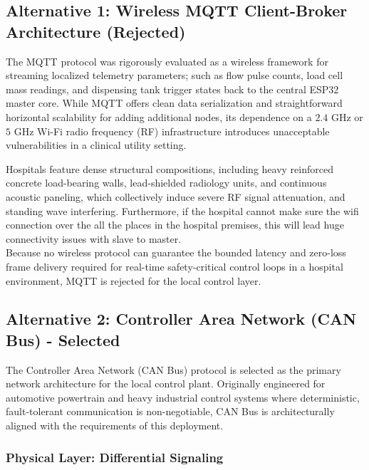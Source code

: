 \documentclass[12pt,a4paper]{article}
\begin{document}
\subsection{Alternative 1: Wireless MQTT Client-Broker Architecture (Rejected)}

The MQTT protocol was rigorously evaluated as a wireless framework for streaming localized telemetry parameters; such as flow pulse counts, load cell mass readings, and dispensing tank trigger states back to the central ESP32 master core. While MQTT offers clean data serialization and straightforward horizontal scalability for adding additional nodes, its dependence on a $2.4\text{ GHz}$ or $5\text{ GHz}$ Wi-Fi radio frequency (RF) infrastructure introduces unacceptable vulnerabilities in a clinical utility setting.

Hospitals feature dense structural compositions, including heavy reinforced concrete load-bearing walls, lead-shielded radiology units, and continuous acoustic paneling, which collectively induce severe RF signal attenuation, and standing wave interfering. Furthermore, if the hospital cannot make sure the wifi connection over the all the places in the hospital premises, this will lead huge connectivity issues with slave to master.
\\Because no wireless protocol can guarantee the bounded latency and zero-loss frame delivery required for real-time safety-critical control loops in a hospital environment, MQTT is rejected for the local control layer.

\subsection{Alternative 2: Controller Area Network (CAN Bus) - Selected}

The Controller Area Network (CAN Bus) protocol is selected as the primary network architecture for the local control plant. Originally engineered for automotive powertrain and heavy industrial control systems where deterministic, fault-tolerant communication is non-negotiable, CAN Bus is architecturally aligned with the requirements of this deployment.

\subsubsection*{Physical Layer: Differential Signaling}
\end{document}
